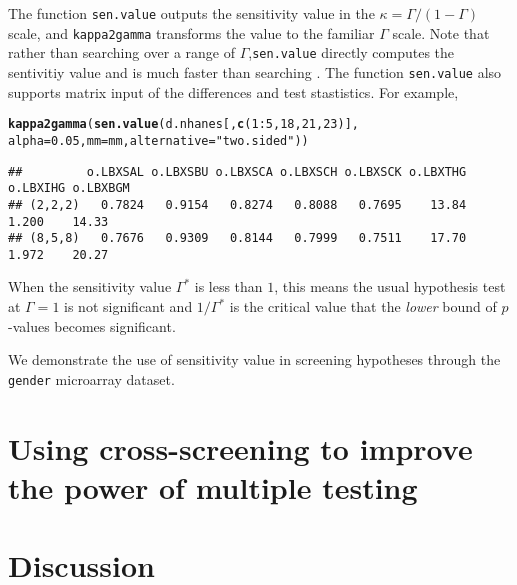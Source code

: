 \documentclass[11pt]{article}\usepackage[]{graphicx}\usepackage[]{color}
\makeatletter
\newcommand{\hlnum}[1]{\textcolor[rgb]{0.686,0.059,0.569}{#1}}%
\newcommand{\hlstr}[1]{\textcolor[rgb]{0.192,0.494,0.8}{#1}}%
\newcommand{\hlopt}[1]{\textcolor[rgb]{0,0,0}{#1}}%
\newcommand{\hlstd}[1]{\textcolor[rgb]{0.345,0.345,0.345}{#1}}%
\newcommand{\hlkwc}[1]{\textcolor[rgb]{0.333,0.667,0.333}{#1}}%
\newcommand{\hlkwd}[1]{\textcolor[rgb]{0.737,0.353,0.396}{\textbf{#1}}}%
\newenvironment{kframe}{%
 \def\at@end@of@kframe{}%
 \ifinner\ifhmode%
  \def\at@end@of@kframe{\end{minipage}}%
  \begin{minipage}{\columnwidth}%
 \fi\fi%
 \def\FrameCommand##1{\hskip\@totalleftmargin \hskip-\fboxsep
 \colorbox{shadecolor}{##1}\hskip-\fboxsep
     \hskip-\linewidth \hskip-\@totalleftmargin \hskip\columnwidth}%
 \MakeFramed {\advance\hsize-\width
   \@totalleftmargin\z@ \linewidth\hsize
   \@setminipage}}%
 {\par\unskip\endMakeFramed%
 \at@end@of@kframe}
\newenvironment{knitrout}{}{} %
\makeatother
\begin{document}
The function \texttt{sen.value} outputs the sensitivity value in the $\kappa = \Gamma / (1 - \Gamma)$ scale, and \texttt{kappa2gamma} transforms the value to the familiar $\Gamma$ scale. Note that rather than searching over a range of $\Gamma$,\texttt{sen.value} directly computes the sentivitiy value and is much faster than searching \citep{zhao2017sensitivity}. The function \texttt{sen.value} also supports matrix input of the differences and test stastistics. For example,
\begin{knitrout}
\color{fgcolor}\begin{kframe}
\begin{alltt}
\hlkwd{kappa2gamma}\hlstd{(}\hlkwd{sen.value}\hlstd{(d.nhanes[,} \hlkwd{c}\hlstd{(}\hlnum{1}\hlopt{:}\hlnum{5}\hlstd{,} \hlnum{18}\hlstd{,} \hlnum{21}\hlstd{,} \hlnum{23}\hlstd{)],}
                      \hlkwc{alpha} \hlstd{=} \hlnum{0.05}\hlstd{,} \hlkwc{mm} \hlstd{= mm,} \hlkwc{alternative} \hlstd{=} \hlstr{"two.sided"}\hlstd{))}
\end{alltt}
\begin{verbatim}
##         o.LBXSAL o.LBXSBU o.LBXSCA o.LBXSCH o.LBXSCK o.LBXTHG o.LBXIHG o.LBXBGM
## (2,2,2)   0.7824   0.9154   0.8274   0.8088   0.7695    13.84    1.200    14.33
## (8,5,8)   0.7676   0.9309   0.8144   0.7999   0.7511    17.70    1.972    20.27
\end{verbatim}
\end{kframe}
\end{knitrout}
When the sensitivity value $\Gamma^*$ is less than $1$, this means the usual hypothesis test at $\Gamma=1$ is not significant and $1/\Gamma^*$ is the critical value that the \emph{lower} bound of $p$-values becomes significant.

We demonstrate the use of sensitivity value in screening hypotheses through the \texttt{gender} microarray dataset.



\section{Using cross-screening to improve the power of multiple testing}
\label{sec:cross-screen}

\section{Discussion}
\label{sec:discussion}

 

\end{document}
